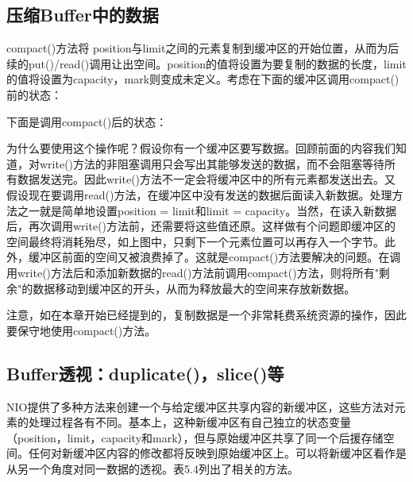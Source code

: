		

	\subsection{压缩Buffer中的数据}

		compact()方法将 position与limit之间的元素复制到缓冲区的开始位置，从而为后续的put()/read()调用让出空间。position的值将设置为要复制的数据的长度，limit的值将设置为capacity，mark则变成未定义。考虑在下面的缓冲区调用compact()前的状态： 

		

		下面是调用compact()后的状态： 

		

		为什么要使用这个操作呢？假设你有一个缓冲区要写数据。回顾前面的内容我们知道，对write()方法的非阻塞调用只会写出其能够发送的数据，而不会阻塞等待所有数据发送完。因此write()方法不一定会将缓冲区中的所有元素都发送出去。又假设现在要调用read()方法，在缓冲区中没有发送的数据后面读入新数据。处理方法之一就是简单地设置position = limit和limit = capacity。当然，在读入新数据后，再次调用write()方法前，还需要将这些值还原。这样做有个问题即缓冲区的空间最终将消耗殆尽，如上图中，只剩下一个元素位置可以再存入一个字节。此外，缓冲区前面的空间又被浪费掉了。这就是compact()方法要解决的问题。在调用write()方法后和添加新数据的read()方法前调用compact()方法，则将所有"剩余"的数据移动到缓冲区的开头，从而为释放最大的空间来存放新数据。 

		

		注意，如在本章开始已经提到的，复制数据是一个非常耗费系统资源的操作，因此要保守地使用compact()方法。 

	\subsection{Buffer透视：duplicate()，slice()等} 

		NIO提供了多种方法来创建一个与给定缓冲区共享内容的新缓冲区，这些方法对元素的处理过程各有不同。基本上，这种新缓冲区有自己独立的状态变量（position，limit，capacity和mark），但与原始缓冲区共享了同一个后援存储空间。任何对新缓冲区内容的修改都将反映到原始缓冲区上。可以将新缓冲区看作是从另一个角度对同一数据的透视。表5.4列出了相关的方法。 

